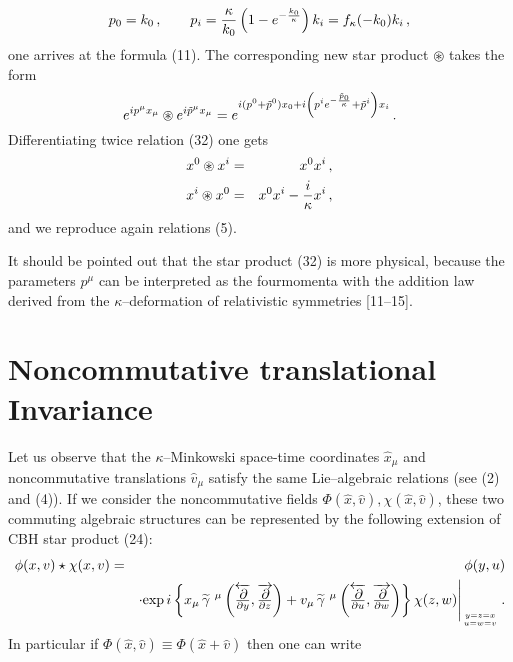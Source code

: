 \documentclass[a4paper,a4paper]{article}
\begin{document}
\begin{equation}
p_{0} = k_{0}\, , \qquad
p_{i} = {\kappa\over k_{0} }
\left( 1 - e^{- {k_{0}\over \kappa} } \right)k_{i}
 = f_{\kappa} (-k_{0})
 k_{i}\, ,
\end{equation}
one arrives at the formula (11). The corresponding new star
product $\circledast$ takes the form
\begin{equation}
e^{ip^{\mu}x_{\mu} } 
\circledast
e^{i \tilde{p} ^{\mu}x_{\mu} }  =
e^{ i (p^{0} +\tilde{p} ^{0} )x_{0} 
+ i
\left( p^{i} 
e^{- {\tilde{p}_{0} \over \kappa}}
+ \tilde{p} ^{i}  \right)
x_{i} } \, .
\end{equation}
Differentiating twice relation (32) one gets
\begin{eqnarray}
x^{0} \circledast x^{i} &= & x^{0}x^{i}\, ,
\cr
x^{i} \circledast  x^{0} &= & x^{0}x^{i} - {i\over \kappa}
x^{i}\, ,
\end{eqnarray}
and we reproduce again relations (5).

It should be pointed out that the  star product (32) is more
physical, because the parameters $p^{\mu}$ can be interpreted as
the fourmomenta with the addition law derived from the
$\kappa$--deformation of relativistic symmetries [11--15].

\section{Noncommutative translational Invariance}

Let us observe that the $\kappa$--Minkowski space-time
coordinates $\hat{x}_{\mu}$ and noncommutative translations
$\hat{v}_{\mu}$ satisfy the same Lie--algebraic relations (see
(2) and (4)). If we consider the noncommutative fields
 $\Phi(\hat{x},\hat{v}), \chi(\hat{x}, \hat{v})$, these two
commuting algebraic structures can be represented by the following
extension of CBH star product (24):
\begin{eqnarray}
\phi (x,v) \star \chi(x,v) &=& \phi(y,u) 
\\
&&     
\cdot \hbox{exp} \, i\left\{ x_{\mu} \, \widetilde{\gamma}\ ^{\mu} 
\left(
 \overleftarrow{\partial \over \partial y}, 
  \overrightarrow{\partial \over \partial z}
  \right) +
  v_{\mu}\,  \widetilde{\gamma} \ ^{\mu}
  \left(
 \overleftarrow{\partial \over \partial u}, 
  \overrightarrow{\partial \over \partial w}
\right)  \right\}
 \chi(z,w)\Bigg|_{y=z=x \atop u=w=v}\, .
 \nonumber
  \end{eqnarray}
In particular if $\Phi(\hat{x},\hat{v}) \equiv \Phi(\hat{x} +
\hat{v})$ then one can write
  
\end{document}
